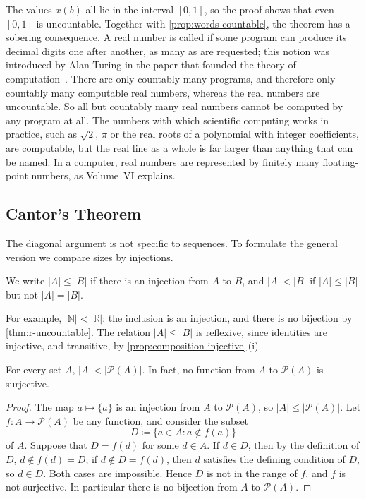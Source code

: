 The values $x(b)$ all lie in the interval $[0,1]$, so the proof shows that even $[0,1]$ is uncountable. Together with \cref{prop:words-countable}, the theorem has a sobering consequence. A real number is called  if some program can produce its decimal digits one after another, as many as are requested; this notion was introduced by Alan Turing in the paper that founded the theory of computation~\cite{turing1936}. There are only countably many programs, and therefore only countably many computable real numbers, whereas the real numbers are uncountable. So all but countably many real numbers cannot be computed by any program at all. The numbers with which scientific computing works in practice, such as $\sqrt2$, $\pi$ or the real roots of a polynomial with integer coefficients, are computable, but the real line as a whole is far larger than anything that can be named. In a computer, real numbers are represented by finitely many floating-point numbers, as Volume~VI explains.

\subsection{Cantor's Theorem}

The diagonal argument is not specific to sequences. To formulate the general version we compare sizes by injections.

\begin{definition}
\label{def:card-le}
We write $|A|\le|B|$ if there is an injection from $A$ to $B$, and $|A|<|B|$ if $|A|\le|B|$ but not $|A|=|B|$.
\end{definition}

For example, $|\mathbb N|<|\mathbb R|$: the inclusion is an injection, and there is no bijection by \cref{thm:r-uncountable}. The relation $|A|\le|B|$ is reflexive, since identities are injective, and transitive, by \cref{prop:composition-injective}\,(i).

\begin{theorem}
\label{thm:cantor}
For every set $A$, $|A|<|\mathcal P(A)|$. In fact, no function from $A$ to $\mathcal P(A)$ is surjective.
\end{theorem}

\begin{proof}
The map $a\mapsto\{a\}$ is an injection from $A$ to $\mathcal P(A)$, so $|A|\le|\mathcal P(A)|$. Let $f\colon A\to\mathcal P(A)$ be any function, and consider the subset
\[
D\coloneqq\{a\in A: a\notin f(a)\}
\]
of $A$. Suppose that $D=f(d)$ for some $d\in A$. If $d\in D$, then by the definition of $D$, $d\notin f(d)=D$; if $d\notin D=f(d)$, then $d$ satisfies the defining condition of $D$, so $d\in D$. Both cases are impossible. Hence $D$ is not in the range of $f$, and $f$ is not surjective. In particular there is no bijection from $A$ to $\mathcal P(A)$.
\end{proof}


